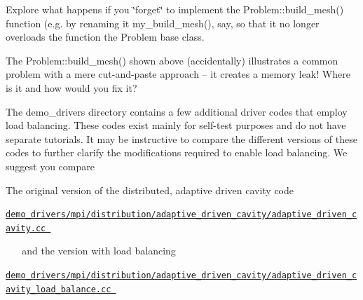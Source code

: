 \begin{DoxyEnumerate}
\item Explore what happens if you \char`\"{}forget\char`\"{} to implement the {\ttfamily Problem\+::build\+\_\+mesh()} function (e.\+g. by renaming it {\ttfamily my\+\_\+build\+\_\+mesh()}, say, so that it no longer overloads the function the {\ttfamily Problem} base class. ~\newline
~\newline

\item The {\ttfamily Problem\+::build\+\_\+mesh()} shown above (accidentally) illustrates a common problem with a mere cut-\/and-\/paste approach -- it creates a memory leak! Where is it and how would you fix it? ~\newline
~\newline

\item The {\ttfamily demo\+\_\+drivers} directory contains a few additional driver codes that employ load balancing. These codes exist mainly for self-\/test purposes and do not have separate tutorials. It may be instructive to compare the different versions of these codes to further clarify the modifications required to enable load balancing. We suggest you compare ~\newline
~\newline

\begin{DoxyItemize}
\item The original version of the distributed, adaptive driven cavity code ~\newline
~\newline
 \begin{center} \href{../../../../demo_drivers/mpi/distribution/adaptive_driven_cavity/adaptive_driven_cavity.cc}{\tt demo\+\_\+drivers/mpi/distribution/adaptive\+\_\+driven\+\_\+cavity/adaptive\+\_\+driven\+\_\+cavity.\+cc } \end{center}  ~\newline
~\newline
 and the version with load balancing ~\newline
~\newline
 \begin{center} \href{../../../../demo_drivers/mpi/distribution/adaptive_driven_cavity/adaptive_driven_cavity_load_balance.cc}{\tt demo\+\_\+drivers/mpi/distribution/adaptive\+\_\+driven\+\_\+cavity/adaptive\+\_\+driven\+\_\+cavity\+\_\+load\+\_\+balance.\+cc } \end{center}  ~\newline
~\newline


\end{DoxyItemize}
\end{DoxyEnumerate}

